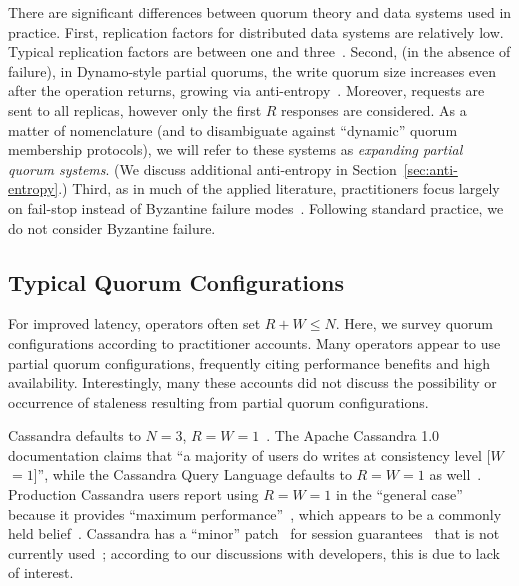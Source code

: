 \documentclass{vldb}
\newcommand{\subsectionskip}{-0em}
\begin{document}
There are significant differences between quorum theory and data
systems used in practice.  First, replication factors for distributed
data systems are relatively low.  Typical replication factors are
between one and three~\cite{cassandradefault, feinbergpc, codapc}.
Second, (in the absence of failure), in Dynamo-style partial quorums,
the write quorum size increases even after the operation returns,
growing via anti-entropy~\cite{antientropy}.  Moreover, requests are
sent to all replicas, however only the first $R$ responses are
considered.  As a matter of nomenclature (and to disambiguate against
``dynamic'' quorum membership protocols), we will refer to these
systems as \textit{expanding partial quorum systems}. (We discuss
additional anti-entropy in Section~\ref{sec:anti-entropy}.) Third, as
in much of the applied literature, practitioners focus largely on
fail-stop instead of Byzantine failure
modes~\cite{birman-byzantine}.  Following standard practice, we do not
consider Byzantine failure.


\vspace{\subsectionskip}\subsection{Typical Quorum Configurations}

For improved latency, operators often set $R+W \leq N$.  Here, we
survey quorum configurations according to practitioner accounts.  Many
operators appear to use partial quorum configurations, frequently
citing performance benefits and high availability. Interestingly, many
these accounts did not discuss the possibility or occurrence of
staleness resulting from partial quorum configurations.

Cassandra defaults to $N$$=$$3$,
$R$$=$$W$$=$$1$~\cite{cassandradefault}. The Apache Cassandra 1.0
documentation claims that ``a majority of users do writes at
consistency level [$W$$=$$1$]'', while the Cassandra Query Language
defaults to $R$$=$$W$$=$$1$ as well~\cite{cassandra-docs}.  Production
Cassandra users report using $R$$=$$W$$=$$1$ in the ``general case''
because it provides ``maximum performance''~\cite{maxperfblog}, which
appears to be a commonly held belief~\cite{reddit, outbrain}.
Cassandra has a ``minor'' patch~\cite{cassandra-session} for session
guarantees~\cite{sessionguarantees} that is not currently
used~\cite{cassandra-session-revert}; according to our
discussions with developers, this is due to lack of interest.
\end{document}
